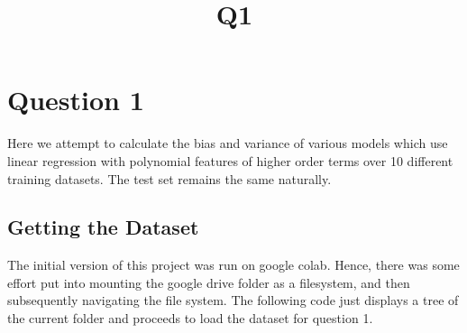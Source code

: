 \documentclass[11pt]{article}
\title{Q1}
\begin{document}
    
    
    \maketitle
    
    

    
    \section{Question 1}\label{question-1}

Here we attempt to calculate the bias and variance of various models
which use linear regression with polynomial features of higher order
terms over 10 different training datasets. The test set remains the same
naturally.

    \subsection{Getting the Dataset}\label{getting-the-dataset}

The initial version of this project was run on google colab. Hence,
there was some effort put into mounting the google drive folder as a
filesystem, and then subsequently navigating the file system. The
following code just displays a tree of the current folder and proceeds
to load the dataset for question 1.
\end{document}

